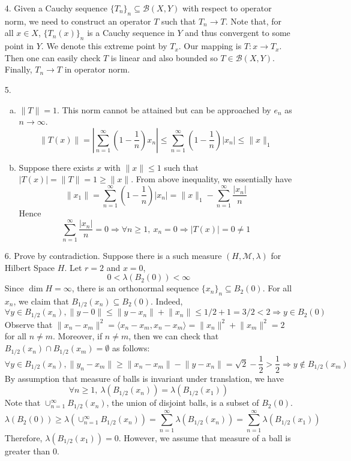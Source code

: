 \begin{itemize}
		\item[4.]  Given a Cauchy sequence $\{T_n\}_n\subseteq \mathcal{B}(X,Y)$ with respect to operator norm, we need to construct an operator $T$ such that $T_n\rightarrow T$. Note that, for all $x\in X$, $\{T_n(x)\}_n$ is a Cauchy sequence in $Y$ and thus convergent to some point in $Y$. We denote this extreme point by $T_x$. Our mapping is $T: x\rightarrow T_x$. Then one can easily check $T$ is linear and also bounded so $T\in \mathcal{B}(X,Y)$. Finally, $T_n\rightarrow T$ in operator norm. 
		
		\item[5.] \begin{enumerate}[(a)]
			\item $\lVert T\rVert  =1$. This norm cannot be attained but can be approached by $e_n$ as $n\rightarrow \infty$.
			$$
			\left\lVert T(x) \right\rVert = \left\lvert \sum_{n=1}^\infty \left(1-\frac{1}{n}\right)x_n  \right\rvert \le  \sum_{n=1}^\infty \left(1-\frac{1}{n}\right) \left\lvert  x_n  \right\rvert  \le \lVert x\rVert_1
			$$
			
			\item Suppose there exists $x$ with $\lVert x\rVert \le 1$ such that $|T(x)| = \lVert T\rVert = 1 \ge \lVert x\rVert$. From above inequality, we essentially have
			$$
			\lVert x_1\rVert = \sum_{n=1}^\infty \left(1-\frac{1}{n}\right) \left\lvert  x_n  \right\rvert = \lVert x\rVert_1 - \sum_{n=1}^\infty \frac{|x_n|}{n}
			$$
			Hence
			$$
			\sum_{n=1}^\infty \frac{|x_n|}{n} = 0 \Rightarrow  \forall n\ge 1,~ x_n=0 \Rightarrow |T(x)| = 0 \neq 1
			$$
		\end{enumerate}
		
		\item[6.] Prove by contradiction. Suppose there is a such measure $(H, \mathcal{M}, \lambda)$ for Hilbert Space $H$. Let $r=2$ and $x=0$, 
		$$
		0<\lambda\left(B_2(0)\right)<\infty
		$$
		Since $\dim H =\infty$, there is an orthonormal sequence $\{x_n\}_n\subseteq B_2(0)$. For all $x_n$, we claim that $B_{1/2}(x_n)\subseteq B_2(0)$. Indeed,
		$$
		\forall y\in B_{1/2}(x_n), \lVert y-0\rVert \le  \lVert y-x_n\rVert + \lVert x_n\rVert \le 1/2 + 1 = 3/2 < 2 \Rightarrow y\in B_2(0)
		$$
		Observe that $\lVert x_n - x_m \rVert ^2 = \langle x_n-x_m, x_n-x_m\rangle = \lVert x_n\rVert^2 + \lVert x_m\rVert^2 = 2$ for all $n\neq m$. Moreover, if $n\neq m$, then we can check that $B_{1/2}(x_n) \cap B_{1/2}(x_m) = \emptyset$ as follows:
		$$
		\forall y\in B_{1/2}(x_n), \lVert y_n - x_m \rVert \ge \lVert x_n -x_m \rVert - \lVert y-x_n\rVert = \sqrt{2} - \frac{1}{2}  > \frac{1}{2} \Rightarrow y\not \in B_{1/2}(x_m) 
		$$
		By assumption that measure of balls is invariant under translation, we have 
		$$\forall n\ge 1, ~\lambda(B_{1/2}(x_n)) = \lambda(B_{1/2}(x_1))$$
		Note that $\cup_{n=1}^\infty B_{1/2}(x_n)$, the union of disjoint balls, is a subset of $B_2(0)$. 
		$$
		\lambda(B_2(0)) \ge \lambda\left( \cup_{n=1}^\infty B_{1/2}(x_n)\right) =\sum_{n=1}^\infty \lambda(B_{1/2}(x_n)) = \sum_{n=1}^\infty \lambda(B_{1/2}(x_1))
		$$
		Therefore, $\lambda(B_{1/2}(x_1)) = 0$. However, we assume that measure of a ball is greater than 0.
		

\end{itemize}
